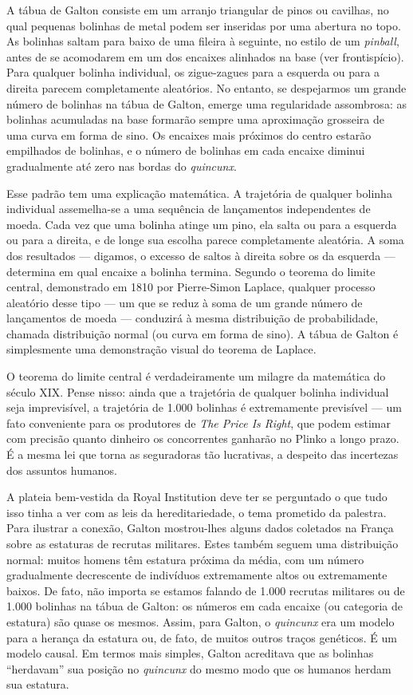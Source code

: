 \documentclass[11pt,a5paper,twoside]{book}
\begin{document}
A tábua de Galton consiste em um arranjo triangular de pinos ou cavilhas, no qual pequenas bolinhas de metal podem ser inseridas por uma abertura no topo. As bolinhas saltam para baixo de uma fileira à seguinte, no estilo de um \textit{pinball}, antes de se acomodarem em um dos encaixes alinhados na base (ver frontispício). Para qualquer bolinha individual, os zigue-zagues para a esquerda ou para a direita parecem completamente aleatórios. No entanto, se despejarmos um grande número de bolinhas na tábua de Galton, emerge uma regularidade assombrosa: as bolinhas acumuladas na base formarão sempre uma aproximação grosseira de uma curva em forma de sino. Os encaixes mais próximos do centro estarão empilhados de bolinhas, e o número de bolinhas em cada encaixe diminui gradualmente até zero nas bordas do \textit{quincunx}.

Esse padrão tem uma explicação matemática. A trajetória de qualquer bolinha individual assemelha-se a uma sequência de lançamentos independentes de moeda. Cada vez que uma bolinha atinge um pino, ela salta ou para a esquerda ou para a direita, e de longe sua escolha parece completamente aleatória. A soma dos resultados — digamos, o excesso de saltos à direita sobre os da esquerda — determina em qual encaixe a bolinha termina. Segundo o teorema do limite central, demonstrado em 1810 por Pierre-Simon Laplace, qualquer processo aleatório desse tipo — um que se reduz à soma de um grande número de lançamentos de moeda — conduzirá à mesma distribuição de probabilidade, chamada distribuição normal (ou curva em forma de sino). A tábua de Galton é simplesmente uma demonstração visual do teorema de Laplace.

O teorema do limite central é verdadeiramente um milagre da matemática do século XIX. Pense nisso: ainda que a trajetória de qualquer bolinha individual seja imprevisível, a trajetória de 1.000 bolinhas é extremamente previsível — um fato conveniente para os produtores de \textit{The Price Is Right}, que podem estimar com precisão quanto dinheiro os concorrentes ganharão no Plinko a longo prazo. É a mesma lei que torna as seguradoras tão lucrativas, a despeito das incertezas dos assuntos humanos.

A plateia bem-vestida da Royal Institution deve ter se perguntado o que tudo isso tinha a ver com as leis da hereditariedade, o tema prometido da palestra. Para ilustrar a conexão, Galton mostrou-lhes alguns dados coletados na França sobre as estaturas de recrutas militares. Estes também seguem uma distribuição normal: muitos homens têm estatura próxima da média, com um número gradualmente decrescente de indivíduos extremamente altos ou extremamente baixos. De fato, não importa se estamos falando de 1.000 recrutas militares ou de 1.000 bolinhas na tábua de Galton: os números em cada encaixe (ou categoria de estatura) são quase os mesmos. Assim, para Galton, o \textit{quincunx} era um modelo para a herança da estatura ou, de fato, de muitos outros traços genéticos. É um modelo causal. Em termos mais simples, Galton acreditava que as bolinhas “herdavam” sua posição no \textit{quincunx} do mesmo modo que os humanos herdam sua estatura.
\end{document}
